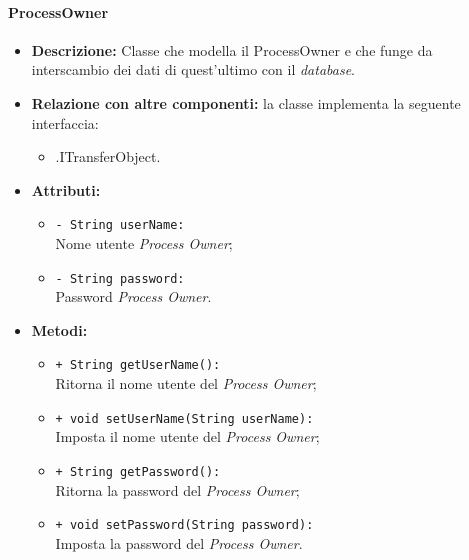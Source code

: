 \paragraph{ProcessOwner}
\label{botpowner}
\begin{flushleft}
\begin{itemize}
\item \textbf{Descrizione:} Classe che modella il ProcessOwner e che funge da interscambio dei dati di quest'ultimo con il \textit{database}.
\item \textbf{Relazione con altre componenti:} la classe implementa la seguente interfaccia:
		\begin{itemize}
			\item \smodel{}.ITransferObject.
		\end{itemize}
\item \textbf{Attributi:}
\begin{sloppypar}
\begin{itemize}
\item \texttt{- String userName:}\\ Nome utente \textit{Process Owner};
\item \texttt{- String password:}\\ Password \textit{Process Owner}.
\end{itemize}
\end{sloppypar}
\item \textbf{Metodi:}
\begin{sloppypar}
\begin{itemize}
\item \texttt{+ String getUserName():}\\ Ritorna il nome utente del \textit{Process Owner};
\item \texttt{+ void setUserName(String userName):}\\ Imposta il nome utente del \textit{Process Owner};
\item \texttt{+ String getPassword():}\\ Ritorna la password del \textit{Process Owner};
\item \texttt{+ void setPassword(String password):}\\ Imposta la password del \textit{Process Owner}. 
\end{itemize}
\end{sloppypar}
\end{itemize}
\end{flushleft}